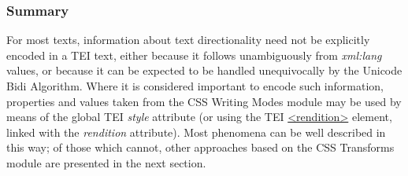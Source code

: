\subsubsection[{Summary}]{Summary}\par
For most texts, information about text directionality need not be explicitly encoded in a TEI text, either because it follows unambiguously from {\itshape xml:lang} values, or because it can be expected to be handled unequivocally by the Unicode Bidi Algorithm. Where it is considered important to encode such information, properties and values taken from the CSS Writing Modes module may be used by means of the global TEI {\itshape style} attribute (or using the TEI \hyperref[TEI.rendition]{<rendition>} element, linked with the {\itshape rendition} attribute). Most phenomena can be well described in this way; of those which cannot, other approaches based on the CSS Transforms module are presented in the next section.
